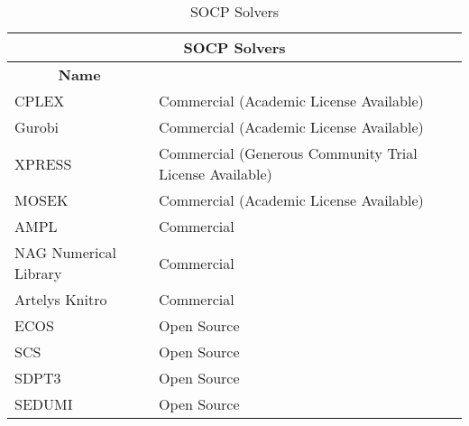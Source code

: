 \newpage
\begin{longtable}{|l|l|}
    \caption{SOCP Solvers}
    \label{tab:SOCP Solvers}\\
\hline
\multicolumn{2}{|c|}{\textbf{SOCP Solvers}}                                                                  \\ \hline
\endfirsthead
%
\endhead
%
\multicolumn{1}{|c|}{\textbf{Name}}         & \multicolumn{1}{l|}{}                                        \\ \hline
\multicolumn{1}{|l|}{CPLEX}                 & \multicolumn{1}{l|}{Commercial (Academic License Available)} \\ \hline
\multicolumn{1}{|l|}{Gurobi}                & \multicolumn{1}{l|}{Commercial (Academic License Available)} \\ \hline
\multicolumn{1}{|l|}{XPRESS} & \multicolumn{1}{l|}{Commercial (Generous Community Trial License Available)} \\ \hline
\multicolumn{1}{|l|}{MOSEK}                 & \multicolumn{1}{l|}{Commercial (Academic License Available)} \\ \hline
\multicolumn{1}{|l|}{AMPL}                  & \multicolumn{1}{l|}{Commercial}                              \\ \hline
\multicolumn{1}{|l|}{NAG Numerical Library} & \multicolumn{1}{l|}{Commercial}                              \\ \hline
\multicolumn{1}{|l|}{Artelys Knitro}        & \multicolumn{1}{l|}{Commercial}                              \\ \hline
\multicolumn{1}{|l|}{ECOS}                  & \multicolumn{1}{l|}{Open Source}                             \\ \hline
\multicolumn{1}{|l|}{SCS}                   & \multicolumn{1}{l|}{Open Source}                             \\ \hline
\multicolumn{1}{|l|}{SDPT3}                 & \multicolumn{1}{l|}{Open Source}                             \\ \hline
\multicolumn{1}{|l|}{SEDUMI}                & \multicolumn{1}{l|}{Open Source}                             \\ \hline
\end{longtable}
